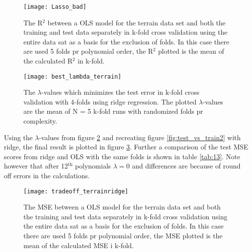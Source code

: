 \documentclass[uio,jmp,amsmath,amssymb,reprint,nofootinbib]{revtex4-1}
\numberwithin{equation}{section}
\begin{document}
\begin{figure}[H]
    \centering
    \texttt{[image: Lasso\_bad]}
    \caption{The R\(^2\) between a OLS model for the terrain data set and both the training and test data separately in k-fold cross validation using the entire data sat as a basis for the exclusion of folds. In this case there are used 5 folds pr polynomial order, the R\(^2\) plotted is the mean of the calculated R\(^2\) in k-fold.}
    \label{fig:lasso_bad}
\end{figure}

\begin{figure}[H]
    \centering
    \texttt{[image: best\_lambda\_terrain]}
    \caption{The \(\lambda\)-values which minimizes the test error in k-fold cross validation with 4-folds using ridge regression. The plotted \(\lambda\)-values are the mean of N = 5 k-fold runs with randomized folds pr complexity.}
    \label{fig:lambda_pr_degree_terrain}
\end{figure}

Using the \(\lambda\)-values from figure \ref{fig:lambda_pr_degree_terrain} and recreating figure \ref{fig:test_vs_train2} with ridge, the final result is plotted in figure \ref{fig:test_vs_train2ridge}. Further a comparison of the test MSE scores from ridge and OLS with the same folds is shown in table \ref{tab:13}. Note however that after 12\(^\text{th}\) polynomials \(\lambda = 0\) and differences are because of round off errors in the calculations.

\begin{figure}[H]
    \centering
    \texttt{[image: tradeoff\_terrainridge]}
    \caption{The MSE between a OLS model for the terrain data set and both the training and test data separately in k-fold cross validation using the entire data sat as a basis for the exclusion of folds. In this case there are used 5 folds pr polynomial order, the MSE plotted is the mean of the calculated MSE i k-fold.}
    \label{fig:test_vs_train2ridge}
\end{figure}
\end{document}
